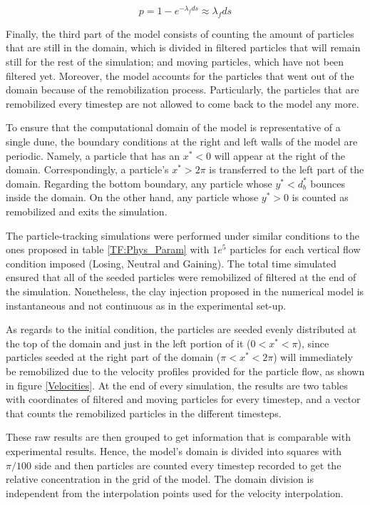 \documentclass[draft,linenumbers]{agujournal2018}
\begin{document}
 \begin{equation}
 \label{Filt_disc}
 	p = 1 - e^{-\lambda_f ds} \approx \lambda_{f} ds
 \end{equation}

Finally, the third part of the model consists of counting the amount of particles that are still in the domain, which is divided in filtered particles that will remain still for the rest of the simulation; and moving particles, which have not been filtered yet. Moreover, the model accounts for the particles that went out of the domain because of the remobilization process. Particularly, the particles that are remobilized every timestep are not allowed to come back to the model any more. 

To ensure that the computational domain of the model is representative of a single dune, the boundary conditions at the right and left walls of the model are periodic. Namely, a particle that has an $x^* < 0$ will appear at the right of the domain. Correspondingly, a particle's $x^* > 2 \pi$ is transferred to the left part of the domain. Regarding the bottom boundary, any particle whose $y^* < d_b^*$ bounces inside the domain. On the other hand, any particle whose $y^* > 0$ is counted as remobilized and exits the simulation. 

The particle-tracking simulations were performed under similar conditions to the ones proposed in table \ref{TF:Phys_Param} with $1e^5$ particles for each vertical flow condition imposed (Losing, Neutral and Gaining). The total time simulated ensured that all of the seeded particles were remobilized of filtered at the end of the simulation. Nonetheless, the clay injection proposed in the numerical model is instantaneous and not continuous as in the experimental set-up. 

As regards to the initial condition, the particles are seeded evenly distributed at the top of the domain and just in the left portion of it ($0 < x^* < \pi$), since particles seeded at the right part of the domain ($\pi < x^* < 2\pi$) will immediately be remobilized due to the velocity profiles provided for the particle flow, as shown in figure \ref{Velocities}. At the end of every simulation, the results are two tables with coordinates of filtered and moving particles for every timestep, and a vector that counts the remobilized particles in the different timesteps. 

These raw results are then grouped to get information that is comparable with experimental results. Hence, the model's domain is divided into squares with $\pi / 100$ side and then particles are counted every timestep recorded to get the relative concentration in the grid of the model. The domain division is independent from the interpolation points used for the velocity interpolation. 
\end{document}
